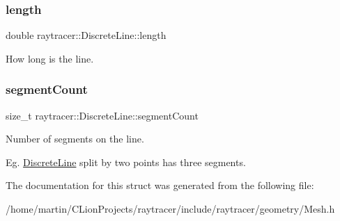 \subsubsection{\texorpdfstring{length}{length}}
{\footnotesize\ttfamily double raytracer\+::\+Discrete\+Line\+::length}



How long is the line. 

\mbox{\label{structraytracer_1_1DiscreteLine_a80395f9fb7bed884f348199fca0f1ccf}} 
\subsubsection{\texorpdfstring{segment\+Count}{segmentCount}}
{\footnotesize\ttfamily size\+\_\+t raytracer\+::\+Discrete\+Line\+::segment\+Count}



Number of segments on the line. 

Eg. \hyperlink{structraytracer_1_1DiscreteLine}{Discrete\+Line} split by two points has three segments. 

The documentation for this struct was generated from the following file\+:\begin{DoxyCompactItemize}
\item 
/home/martin/\+C\+Lion\+Projects/raytracer/include/raytracer/geometry/Mesh.\+h\end{DoxyCompactItemize}
